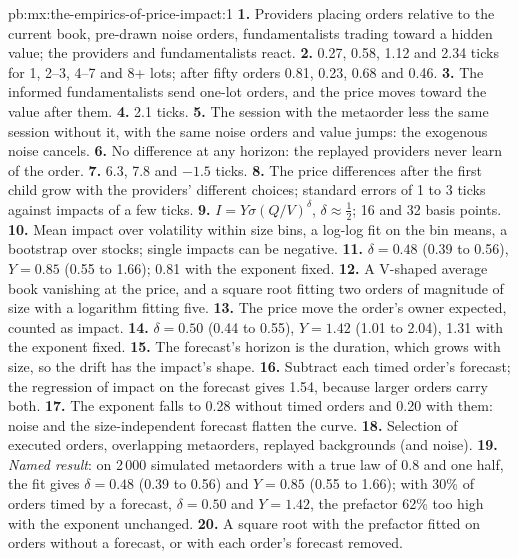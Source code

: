 \begin{solution}{pb:mx:the-empirics-of-price-impact:1}
\textbf{1.} Providers placing orders relative to the current book, pre-drawn noise orders, fundamentalists trading toward a hidden value; the providers and
fundamentalists react.
\textbf{2.} 0.27, 0.58, 1.12 and 2.34 ticks for 1, 2--3, 4--7 and 8+ lots; after fifty orders 0.81, 0.23, 0.68 and 0.46.
\textbf{3.} The informed fundamentalists send one-lot orders, and the price moves toward the value after them.
\textbf{4.} 2.1 ticks.
\textbf{5.} The session with the metaorder less the same session without it, with the same noise orders and value jumps: the exogenous noise cancels.
\textbf{6.} No difference at any horizon: the replayed providers never learn of the order.
\textbf{7.} 6.3, 7.8 and $-1.5$ ticks.
\textbf{8.} The price differences after the first child grow with the providers' different choices; standard errors of 1 to 3 ticks against impacts of a
few ticks.
\textbf{9.} $I=Y\sigma(Q/V)^\delta$, $\delta\approx\tfrac12$; 16 and 32 basis points.
\textbf{10.} Mean impact over volatility within size bins, a log-log fit on the bin means, a bootstrap over stocks; single impacts can be negative.
\textbf{11.} $\delta=0.48$ (0.39 to 0.56), $Y=0.85$ (0.55 to 1.66); 0.81 with the exponent fixed.
\textbf{12.} A V-shaped average book vanishing at the price, and a square root fitting two orders of magnitude of size with a logarithm fitting five.
\textbf{13.} The price move the order's owner expected, counted as impact.
\textbf{14.} $\delta=0.50$ (0.44 to 0.55), $Y=1.42$ (1.01 to 2.04), 1.31 with the exponent fixed.
\textbf{15.} The forecast's horizon is the duration, which grows with size, so the drift has the impact's shape.
\textbf{16.} Subtract each timed order's forecast; the regression of impact on the forecast gives 1.54, because larger orders carry both.
\textbf{17.} The exponent falls to 0.28 without timed orders and 0.20 with them: noise and the size-independent forecast flatten the curve.
\textbf{18.} Selection of executed orders, overlapping metaorders, replayed backgrounds (and noise).
\textbf{19.} \emph{Named result}: on 2\,000 simulated metaorders with a true law of 0.8 and one half, the fit gives $\delta=0.48$ (0.39 to 0.56) and $Y=0.85$ (0.55
to 1.66); with 30\% of orders timed by a forecast, $\delta=0.50$ and $Y=1.42$, the prefactor 62\% too high with the exponent unchanged.
\textbf{20.} A square root with the prefactor fitted on orders without a forecast, or with each order's forecast removed.
\end{solution}

